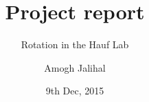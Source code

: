 %
%

\documentclass{beamer}
\usepackage{graphicx}

\title{Project report}

\subtitle{Rotation in the Hauf Lab}

\author{Amogh Jalihal}


\date{9th Dec, 2015}

